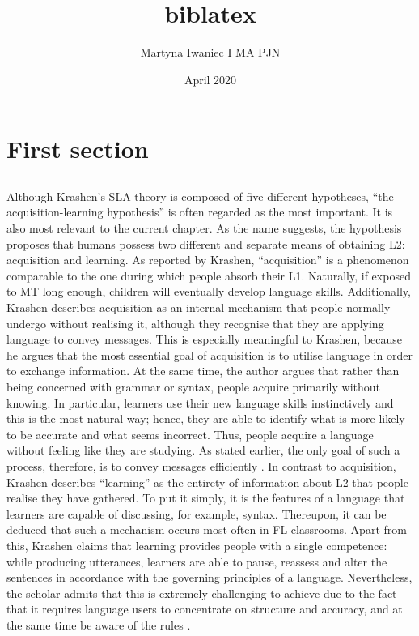 \documentclass{article}
\title{biblatex}
\author{Martyna Iwaniec I MA PJN}
\date{April 2020}
\begin{document}
\maketitle

\tableofcontents

\section{First section}
\subsection{}
Although Krashen’s SLA theory is composed of five different hypotheses, “the acquisition-learning hypothesis” \cite{krashen_principles_1982} is often regarded as the most important. It is also most relevant to the current chapter. As the name suggests, the hypothesis proposes that humans possess two different and separate means of obtaining L2: acquisition and learning.
As reported by Krashen, “acquisition” \cite{krashen_principles_1982} is a phenomenon comparable to the one during which people absorb their L1. Naturally, if exposed to MT long enough, children will eventually develop language skills. Additionally, Krashen describes acquisition as an internal mechanism that people normally undergo without realising it, although they recognise that they are applying language to convey messages. This is especially meaningful to Krashen, because he argues that the most essential goal of acquisition is to utilise language in order to exchange information. At the same time, the author argues that rather than being concerned with grammar or syntax, people acquire primarily without knowing. In particular, learners use their new language skills instinctively and this is the most natural way; hence, they are able to identify what is more likely to be accurate and what seems incorrect. Thus, people acquire a language without feeling like they are studying. As stated earlier, the only goal of such a process, therefore, is to convey messages efficiently \cite{krashen_principles_1982}.
In contrast to acquisition, Krashen describes “learning” \cite{krashen_language_1989} as the entirety of information about L2 that people realise they have gathered. To put it simply, it is the features of a language that learners are capable of discussing, for example, syntax. Thereupon, it can be deduced that such a mechanism occurs most often in FL classrooms. Apart from this, Krashen claims that learning provides people with a single competence: while producing utterances, learners are able to pause, reassess and alter the sentences in accordance with the governing principles of a language. Nevertheless, the scholar admits that this is extremely challenging to achieve due to the fact that it requires language users to concentrate on structure and accuracy, and at the same time be aware of the rules \cite{krashen_language_1989}.
\end{document}
